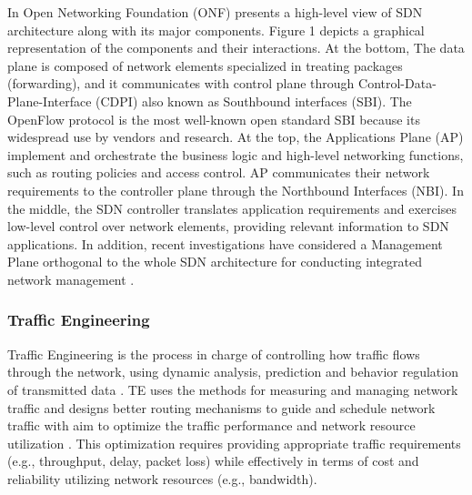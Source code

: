 In \cite{onf_2013:sdn_architecture_overview} Open Networking Foundation (ONF) presents a high-level view of SDN architecture along with its major components. Figure 1 depicts a graphical representation of the components and their interactions. At the bottom, The data plane is composed of network elements specialized in treating packages (forwarding), and it communicates with control plane through Control-Data-Plane-Interface (CDPI) also known as Southbound interfaces (SBI). The OpenFlow protocol \cite{mckeown_2008:openflow, kreutz_2015:sdn_comprehensive_survey, onf_2013:sdn_architecture_overview} is the most well-known open standard SBI because its widespread use by vendors and research. At the top, the Applications Plane (AP) implement and orchestrate the business logic and high-level networking functions, such as routing policies and access control. AP communicates their network requirements to the controller plane through the Northbound Interfaces (NBI). In the middle, the SDN controller translates application requirements and exercises low-level control over network elements, providing relevant information to SDN applications. In addition, recent investigations have considered a Management Plane orthogonal to the whole SDN architecture for conducting integrated network management \cite{ESTRADASOLANO_2017:CIM_model}.

\subsubsection{Traffic Engineering}
\label{subsub:background-te}

Traffic Engineering is the process in charge of controlling how traffic flows through the network, using dynamic analysis, prediction and behavior regulation of transmitted data \cite{feamster_2014:road_sdn, awduche_2002:overview_ti, wang_2008:overview_routing_ti, xiao_2000:ti_mpls}. TE uses the methods for measuring and managing network traffic and designs better routing mechanisms to guide and schedule network traffic with aim to optimize the traffic performance and network resource utilization \cite{shu_2016:traffic_measurement_management}. This optimization requires providing appropriate traffic requirements (e.g., throughput, delay, packet loss) while effectively in terms of cost and reliability utilizing network resources (e.g., bandwidth).

